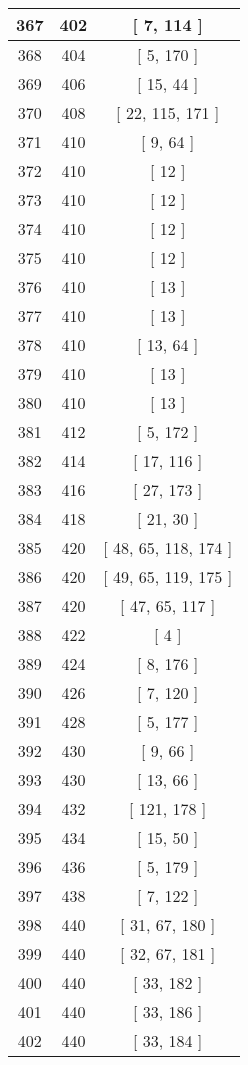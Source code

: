 \begin{center}
\begin{longtable}[H]{|| c c c ||}
367 & 402 & [ 7, 114 ]
\\\hline
368 & 404 & [ 5, 170 ]
\\\hline
369 & 406 & [ 15, 44 ]
\\\hline
370 & 408 & [ 22, 115, 171 ]
\\\hline
371 & 410 & [ 9, 64 ]
\\\hline
372 & 410 & [ 12 ]
\\\hline
373 & 410 & [ 12 ]
\\\hline
374 & 410 & [ 12 ]
\\\hline
375 & 410 & [ 12 ]
\\\hline
376 & 410 & [ 13 ]
\\\hline
377 & 410 & [ 13 ]
\\\hline
378 & 410 & [ 13, 64 ]
\\\hline
379 & 410 & [ 13 ]
\\\hline
380 & 410 & [ 13 ]
\\\hline
381 & 412 & [ 5, 172 ]
\\\hline
382 & 414 & [ 17, 116 ]
\\\hline
383 & 416 & [ 27, 173 ]
\\\hline
384 & 418 & [ 21, 30 ]
\\\hline
385 & 420 & [ 48, 65, 118, 174 ]
\\\hline
386 & 420 & [ 49, 65, 119, 175 ]
\\\hline
387 & 420 & [ 47, 65, 117 ]
\\\hline
388 & 422 & [ 4 ]
\\\hline
389 & 424 & [ 8, 176 ]
\\\hline
390 & 426 & [ 7, 120 ]
\\\hline
391 & 428 & [ 5, 177 ]
\\\hline
392 & 430 & [ 9, 66 ]
\\\hline
393 & 430 & [ 13, 66 ]
\\\hline
394 & 432 & [ 121, 178 ]
\\\hline
395 & 434 & [ 15, 50 ]
\\\hline
396 & 436 & [ 5, 179 ]
\\\hline
397 & 438 & [ 7, 122 ]
\\\hline
398 & 440 & [ 31, 67, 180 ]
\\\hline
399 & 440 & [ 32, 67, 181 ]
\\\hline
400 & 440 & [ 33, 182 ]
\\\hline
401 & 440 & [ 33, 186 ]
\\\hline
402 & 440 & [ 33, 184 ]
\\\hline

\end{longtable}
\end{center}
